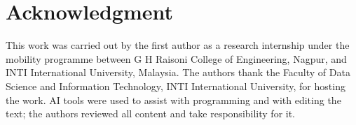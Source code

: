 \documentclass[conference]{IEEEtran}
\begin{document}
\section*{Acknowledgment}
This work was carried out by the first author as a research internship under the mobility programme between G H Raisoni
College of Engineering, Nagpur, and INTI International University, Malaysia. The authors thank the Faculty of Data Science and Information Technology, INTI International University, for
hosting
the work. AI tools were used to assist with programming and with editing the text; the authors reviewed all content and
take responsibility for it.



\end{document}
